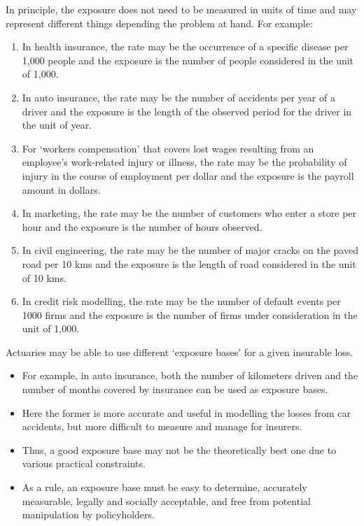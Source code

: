 \documentclass[ignorenonframetext,]{beamer}
\begin{document}
\begin{frame}[allowframebreaks]
\framebreak

 In principle, the exposure does not need to be measured in units of time and may represent different things depending the problem at hand. For example:  
\begin{enumerate}
\item In health insurance, the rate may be the occurrence of a specific disease per 1,000 people and the exposure is the number of people considered in the unit of 1,000. 
\item In auto insurance, the rate may be the number of accidents per year of a driver and the exposure is the length of the observed period for the driver in the unit of year.  
\item For `workers compensation' that covers lost wages resulting from an employee's work-related injury or illness, the rate may be the probability of injury in the course of employment per dollar and the exposure is the payroll amount in dollars. 
\item In marketing, the rate may be  the number of customers who enter a store per hour and the exposure is the number of hours observed.  
\item In civil engineering, the rate may be  the number of major cracks on the paved road per 10 kms and the exposure is the length of road considered in the unit of 10 kms.  
\item In credit risk modelling, the rate may be the number of default events per 1000 firms and the exposure is the number of firms under consideration in the unit of 1,000.  
\end{enumerate}

\framebreak

Actuaries may be able to use different `exposure bases' for a given insurable loss. 
\begin{itemize}
\item For example, in auto insurance, both the number of kilometers driven and the number of months covered by insurance can be used as exposure bases. 
\item Here the former is more accurate and useful in modelling the losses from car accidents, but more difficult to measure and manage for insurers. 
\item Thus, a good exposure base  may not be the theoretically  best one due to various practical constraints.
\item As a rule, an exposure base must be easy to determine, accurately measurable, legally and socially acceptable, and free from potential manipulation by policyholders.  
\end{itemize}


\end{frame}
\end{document}
